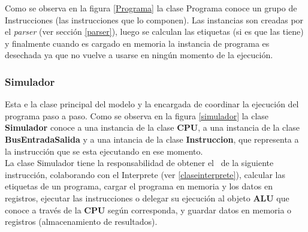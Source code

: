 Como se observa en la figura \ref{Programa} la clase Programa conoce un grupo de Instrucciones (las instrucciones que lo componen). Las instancias son creadas por el \textit{parser} (ver sección \ref{parser}), luego se calculan las etiquetas (si es que las tiene) y finalmente cuando es cargado en memoria la instancia de programa es desechada ya que no vuelve a usarse en ningún momento de la ejecución.


\subsubsection{Simulador}

Esta e la clase principal del modelo y la encargada de coordinar la ejecución del programa paso a paso. Como se observa en la figura \ref{simulador} la clase \textbf{Simulador} conoce a una instancia de la clase \textbf{CPU}, a una instancia de la clase \textbf{BusEntradaSalida} y a una intancia de la clase \textbf{Instruccion}, que representa a la instrucción que se esta ejecutando en ese momento.\\

La clase Simulador tiene la responsabilidad de obtener el \codmaq\ de la siguiente instrucción, colaborando con el Interprete (ver \ref{claseinterprete}), calcular las etiquetas de un programa, cargar el programa en memoria y los datos en registros,  ejecutar las instrucciones o delegar su ejecución al objeto \textbf{ALU} que conoce a través de la \textbf{CPU} según corresponda, y guardar datos en memoria o registros (almacenamiento de resultados).







